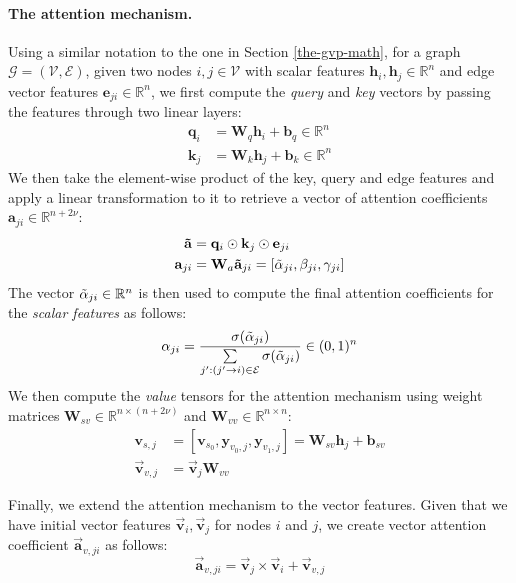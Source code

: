\paragraph{The attention mechanism.} Using a similar notation to the one in Section \ref{the-gvp-math}, for a graph $\mathcal{G} = (\mathcal{V}, \mathcal{E})$, given two nodes $i, j \in \mathcal{V}$ with scalar features $\mathbf{h}_i, \mathbf{h}_j \in \mathbb{R}^{n}$ and edge vector features $\mathbf{e}_{ji}\in \mathbb{R}^n$, we first compute the \textit{query} and \textit{key} vectors by passing the features through two linear layers:
\begin{align}
    \mathbf{q}_i &= \mathbf{W}_q\mathbf{h}_i + \mathbf{b}_q \in \mathbb{R}^n\\
    \mathbf{k}_j &= \mathbf{W}_k\mathbf{h}_j + \mathbf{b}_k \in \mathbb{R}^n
\end{align}
We then take the element-wise product of the key, query and edge features and apply a linear transformation to it to retrieve a vector of attention coefficients $\mathbf{a}_{ji} \in \mathbb{R}^{n + 2\nu}$:
\begin{align}
    \mathbf{\Tilde{a}} &= \mathbf{q}_i \odot \mathbf{k}_j \odot \mathbf{e}_{ji} \\
    \mathbf{a}_{ji} &= \mathbf{W}_a\mathbf{\Tilde{a}}_{ji} = [\Tilde{\mathbf{\alpha}}_{ji}, \mathbf{\beta}_{ji}, \mathbf{\gamma}_{ji}]
\label{attention-coeffs}
\end{align}
The vector $\Tilde{\mathbf{\alpha}}_{ji} \in \mathbb{R}^{n}$ is then used to compute the final attention coefficients for the \textit{scalar features} as follows:
\begin{equation}
    \mathbf{\alpha}_{ji} = \frac{\sigma(\Tilde{\mathbf{\alpha}}_{ji})}{\sum\limits_{j':(j'\rightarrow i)\in\mathcal{E}}\sigma(\Tilde{\mathbf{\alpha}}_{ji})} \in (0, 1)^{n}
\end{equation}
We then compute the \textit{value} tensors for the attention mechanism using weight matrices $\mathbf{W}_{sv}\in\mathbb{R}^{n\times (n+2\nu)}$ and $\mathbf{W}_{vv}\in\mathbb{R}^{n\times n}$:
\begin{align}
    \label{value-tensors} \mathbf{v}_{s, j} &= [\mathbf{v}_{s_0}, \mathbf{y}_{v_0, j}, \mathbf{y}_{v_1, j}] = \mathbf{W}_{sv}\mathbf{h}_j + \mathbf{b}_{sv}  
    \\ \vec{\mathbf{v}}_{v, j} &= \vec{\mathbf{v}}_j\mathbf{W}_{vv}
\end{align}

Finally, we extend the attention mechanism to the vector features. Given that we have initial vector features $\vec{\mathbf{v}}_i, \vec{\mathbf{v}}_j$ for nodes $i$ and $j$, we create vector attention coefficient $\vec{\mathbf{a}}_{v, ji}$ as follows:
\begin{equation}
    \vec{\mathbf{a}}_{v, ji} = \vec{\mathbf{v}}_j \times \vec{\mathbf{v}}_i + \vec{\mathbf{v}}_{v, j}
\end{equation}


